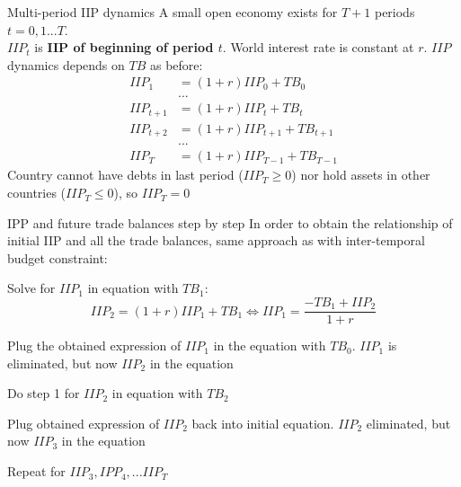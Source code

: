 \documentclass{beamer}
\newenvironment{mynumerate}
{\vfill\enumerate[nolistsep,itemsep=\fill,label=\arabic*.]}
  {\endenumerate}
\begin{document}
  \begin{frame}{Multi-period IIP dynamics}
  A small open economy exists for $T+1$ periods $t=0, 1 ... T$.  \\ $IIP_t$ is \textbf{IIP of beginning of period $t$}. World interest rate is constant at $r$. $IIP$ dynamics depends on $TB$ as before:
	  \begin{align*}
   IIP_1 &= (1+r) IIP_0 + TB_0 \\
   &... \\
	  IIP_{t+1} &= (1+r) IIP_t + TB_t \\
	  IIP_{t+2} &= (1+r) IIP_{t+1} + TB_{t+1} \\
   &... \\
   IIP_T &= (1+r) IIP_{T-1} + TB_{T-1}
	  \end{align*}
   Country cannot have debts in last period ($IIP_{T} \geq 0$) nor hold assets in other countries ($IIP_{T} \leq 0$), so $IIP_{T} = 0$ 
  \end{frame}
  
  \begin{frame}{IPP and future trade balances step by step}
	In order to obtain the relationship of initial IIP and all the trade balances, same approach as with inter-temporal budget constraint: 
\begin{mynumerate}
    \item Solve for $IIP_1$ in equation with $TB_1$:
	\begin{equation*}
	IIP_2 = (1+r) IIP_1 + TB_1 \Leftrightarrow 
	IIP_{1} = \frac{-TB_1 + IIP_{2}}{1+r}
    \end{equation*}
 \item Plug the obtained expression of $IIP_1$ in the equation with $TB_0$. $IIP_1$ is eliminated, but now $IIP_2$ in the equation
 \item Do step 1 for $IIP_2$ in equation with $TB_2$
 \item Plug obtained expression of $IIP_2$ back into initial equation. $IIP_2$ eliminated, but now $IIP_3$ in the equation
 \item Repeat for $IIP_{3}, IPP_{4}, ... IIP_{T}$
\end{mynumerate}
\end{frame}
\end{document}
